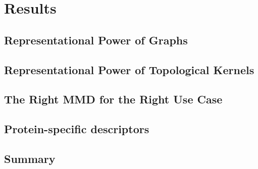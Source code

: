 \chapter{Results}


\section{Representational Power of Graphs}

\section{Representational Power of Topological Kernels}

\section{The Right MMD for the Right Use Case}

\section{Protein-specific descriptors}









\section{Summary}
